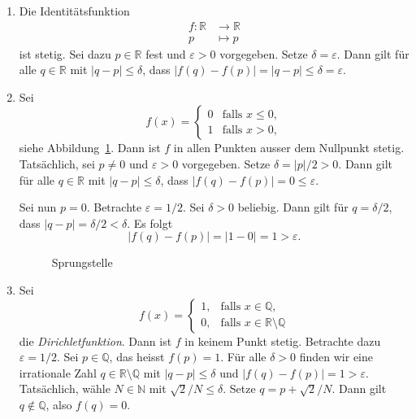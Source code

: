 \documentclass[../main.tex]{subfiles}
\begin{document}
\begin{examples}
  \leavevmode
  \begin{enumerate}[(1)]
    \item Die Identitätsfunktion
      \begin{align*}
        f \colon \mathbb{R} & \to \mathbb{R} \\
        p & \mapsto p
      \end{align*}
      ist stetig. Sei dazu $p \in \mathbb{R}$ fest
      und $\varepsilon > 0$ vorgegeben.
      Setze $\delta = \varepsilon$. Dann gilt
      für alle $q \in \mathbb{R}$ mit
      $|q - p| \leq \delta$, dass
      $|f(q) - f(p)| = |q - p| \leq \delta = \varepsilon$.
    \item Sei
      \[
        f(x) = 
        \begin{cases}
          0 & \text{falls } x \leq 0, \\
          1 & \text{falls } x > 0,
        \end{cases}
      \]
      siehe Abbildung~\ref{fig:jump}.
      Dann ist $f$ in allen Punkten ausser dem
      Nullpunkt stetig.
      Tatsächlich, sei $p \neq 0$
      und $\varepsilon > 0$ 
      vorgegeben.
      Setze $\delta = |p|/2 > 0$.
      Dann gilt für alle $q \in \mathbb{R}$ 
      mit $|q - p| \leq \delta$, dass
      $|f(q) - f(p)| = 0 \leq \varepsilon$.
      
      Sei nun $p = 0$. Betrachte $\varepsilon = 1/2$.
      Sei $\delta > 0$ beliebig.
      Dann gilt für $q = \delta/2$, dass
      $|q - p| = \delta/2 < \delta$.
      Es folgt
      \[
        |f(q) - f(p)| = |1 - 0| = 1 > \varepsilon.
      \]
      \begin{figure}[htb]
        \centering
      
        \caption{Sprungstelle}%
        \label{fig:jump}
      \end{figure}

    \item Sei
      \[
        f(x) = 
        \begin{cases}
          1, & \text{falls } x \in \mathbb{Q}, \\
        0,& \text{falls } x \in \mathbb{R} \setminus \mathbb{Q}
        \end{cases}
      \]
      die \emph{Dirichletfunktion}.
      Dann ist $f$ in keinem Punkt stetig.
      Betrachte dazu $\varepsilon = 1/2$.
      Sei $p \in \mathbb{Q}$, das heisst $f(p) = 1$.
      Für alle $\delta > 0$ finden wir eine
      irrationale Zahl
      $q \in \mathbb{R} \setminus \mathbb{Q}$ mit
      $|q - p| \leq \delta$ 
      und
      $|f(q) - f(p)| = 1 > \varepsilon$.
      Tatsächlich, wähle $N \in \mathbb{N}$ 
      mit $\sqrt 2 / N \leq \delta$.
      Setze
      $q = p +\sqrt 2/N$. Dann gilt  $q \notin \mathbb{Q}$,
      also $f(q) = 0$.


\end{enumerate}
\end{examples}
\end{document}
